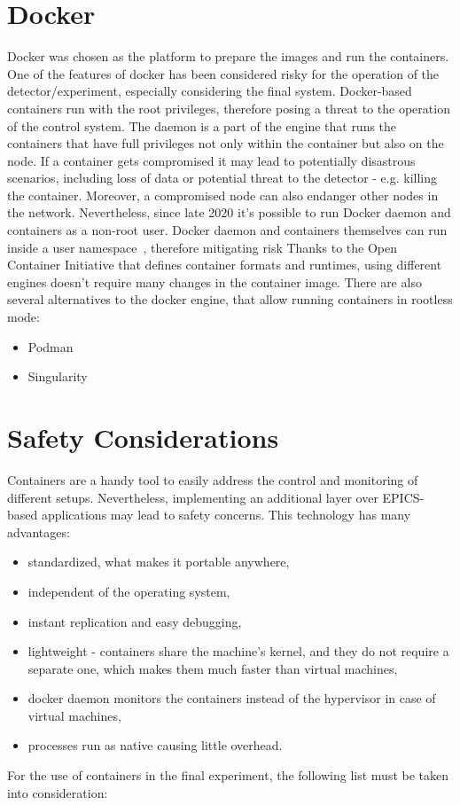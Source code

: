 \section{Docker}
Docker was chosen as the platform to prepare the images and run the containers. One of the features of docker has been considered risky for the operation of the detector/experiment, especially considering the final system. Docker-based containers run with the root privileges, therefore posing a threat to the operation of the control system. The daemon is a part of the engine that runs the containers that have full privileges not only within the container but also on the node. If a container gets compromised it may lead to potentially disastrous scenarios, including loss of data or potential threat to the detector - e.g. killing the container. Moreover, a compromised node can also endanger other nodes in the network.  Nevertheless, since late 2020 it's possible to run Docker daemon and containers as a non-root user. Docker daemon and containers themselves can run inside a user namespace~\cite{docker_limitations}, therefore mitigating risk
 Thanks to the Open Container Initiative that defines container formats and runtimes, using different engines doesn't require many changes in the container image. There are also several alternatives to the docker engine, that allow running containers in rootless mode:
\begin{itemize}
    \item Podman~\cite{Podman} 
    \item Singularity~\cite{singularity}
\end{itemize}
\section{Safety Considerations}
Containers are a handy tool to easily address the control and monitoring of different setups. Nevertheless, implementing an additional layer over EPICS-based applications may lead to safety concerns. This technology has many advantages:
\begin{itemize}
    \item standardized, what makes it portable anywhere,
    \item independent of the operating system,
    \item instant replication and easy debugging,
    \item lightweight - containers share the machine's kernel, and they do not require a separate one, which makes them much faster than virtual machines,
    \item docker daemon monitors the containers instead of the hypervisor in case of virtual machines,
    \item processes run as native causing little overhead.
\end{itemize}
For the use of containers in the final experiment, the following list must be taken into consideration:


